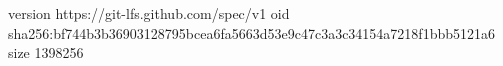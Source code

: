 version https://git-lfs.github.com/spec/v1
oid sha256:bf744b3b36903128795bcea6fa5663d53e9c47c3a3c34154a7218f1bbb5121a6
size 1398256
